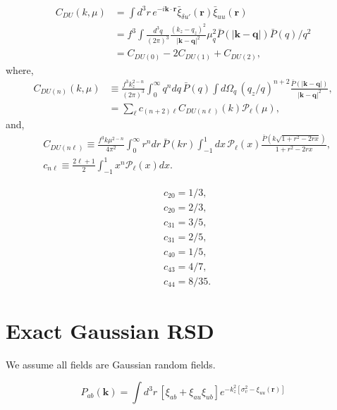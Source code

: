 \documentclass[a4paper,11pt, fleqn]{article}
\begin{document}
\begin{align}
  C_{DU}(k, \mu) &= \int \! d^3 r \, e^{-i\bm{k}\cdot\bm{r}}
                    \bar{\xi}_{\delta u'}(\bm{r}) \bar{\xi}_{uu}(\bm{r})\\
                 &= f^3 \int \!\frac{d^3 q}{(2\pi)^3}
                    \frac{(k_z - q_z)^2}{|\bm{k} - \bm{q}|^2} \mu_q^2
              \bar{P}\left(|\bm{k} - \bm{q}|\right) \bar{P}(q)/q^2\\
  &= C_{DU(0)} - 2 C_{DU(1)} + C_{DU(2)},
\end{align}
where,
\begin{align}
  C_{DU(n)}(k, \mu)
    &\equiv \frac{f^3 k_z^{2 - n}}{(2\pi)^3}
              \int_0^\infty\! q^n dq \, \bar{P}(q) \int \!d\Omega_q \,
              (q_z/q)^{n + 2}
              \frac{\bar{P}\left( | \bm{k} - \bm{q} |\right)}{|\bm{k} - \bm{q}|^2},\\
    &= \sum_\ell c_{(n+2)\ell} C_{DU(n\ell)}(k) \mathcal{P}_\ell(\mu),
\end{align}
and,
\begin{align}
  &C_{DU(n\ell)} \equiv
    \frac{f^3 k \mu^{2 - n}}{4\pi^2} \int_0^\infty \! r^n dr \, \bar{P}(kr)
    \int_{-1}^1 \!dx \,
    \mathcal{P}_\ell(x)
    \frac{\bar{P}\left(k \sqrt{1 + r^2 - 2rx}\right)}{1 + r^2 -2rx},\\
    &c_{n\ell} \equiv \frac{2\ell + 1}{2}
                     \int_{-1}^1 x^n \mathcal{P}_\ell(x) dx.
\end{align}

\begin{equation}\begin{split}
  &c_{20} = 1/3,\\
  &c_{20} = 2/3,\\
  &c_{31} = 3/5,\\
  &c_{31} = 2/5,\\
  &c_{40} = 1/5,\\
  &c_{43} = 4/7,\\
  &c_{44} = 8/35.
\end{split}\end{equation}

\clearpage
\section{Exact Gaussian RSD}

We assume all fields are Gaussian random fields.

\begin{equation}
  P_{ab}(\bm{k}) = \int\! d^3 r \,
  \left[ \xi_{ab} + \xi_{au}\xi_{ub} \right]
  e^{-k_z^2 [ \sigma^2_v - \xi_{uu}(\bm{r}) ]}
\end{equation}
\end{document}
